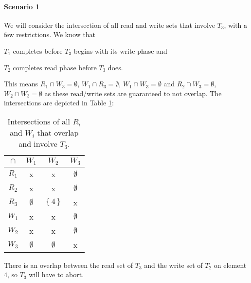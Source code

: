 \documentclass[11pt,a4paper,english]{article}
\begin{document}
\paragraph{Scenario 1}
We will consider the intersection of all read and write sets that involve
$T_{3}$, with a few restrictions. We know that \begin{inparaenum}[1)] \item
  $T_{1}$ completes before
$T_{3}$ begins with its write phase and \item $T_{2}$ completes read phase before
$T_{3}$ does.\end{inparaenum} This means $R_{1} \cap W_{3} = \emptyset$,
$W_{1} \cap R_{3} = \emptyset$, $W_{1} \cap W_{3} = \emptyset$ and
$R_{2} \cap W_{3} = \emptyset$, $W_{2} \cap W_{3} = \emptyset$ as these
read/write sets are guaranteed to not overlap. The intersections are depicted in
Table \ref{tbl:scenario1}:
\begin{table}[!hbt]
\centering
\begin{tabular}{|c|c|c|c|}
\hline
$\cap$  & $W_{1}$ & $W_{2}$ & $W_{3}$    \\ \hline
$R_{1}$ & x  & x  & $\emptyset$ \\ \hline
$R_{2}$ & x  & x  & $\emptyset$ \\ \hline
$R_{3}$ & $\emptyset$ & $\left\{ 4 \right\}$ & x \\ \hline
$W_{1}$ & x  & x  & $\emptyset$ \\ \hline
$W_{2}$ & x  & x  & $\emptyset$ \\ \hline
$W_{3}$ & $\emptyset$ & $\emptyset$ & x \\ \hline
\end{tabular}
\caption{Intersections of all $R_{i}$ and $W_{i}$ that overlap and involve $T_{3}$.}
\label{tbl:scenario1}
\end{table}

There is an overlap between the read set of $T_{3}$ and the write set of $T_{2}$ on element $4$, so $T_{3}$ will have to abort.
\end{document}
